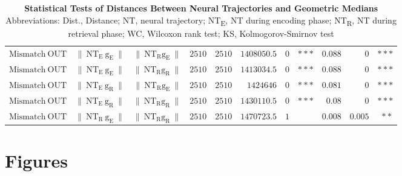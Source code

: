 \documentclass[preprint,review,12pt]{elsarticle}%
\begin{document}
\begin{table}[htbp]
\begin{tabular}{*{11}{r}}
\rowcolor{lightgray}
$\mathrm{Mismatch\ OUT}$ & $\mathrm{\mathrm{\lVert\ NT_{E}\ g_{E}\ \rVert}}$ & $\mathrm{{\mathrm{\lVert\ NT_{R}g_{E}}\ \rVert}}$ & $\mathrm{2510}$ & $\mathrm{2510}$ & $\mathrm{1408050.5}$ & $\mathrm{0}$ & $\mathrm{***}$ & $\mathrm{0.088}$ & $\mathrm{0}$ & $\mathrm{***}$\\
$\mathrm{Mismatch\ OUT}$ & $\mathrm{\mathrm{\lVert\ NT_{E}\ g_{E}\ \rVert}}$ & $\mathrm{{\mathrm{\lVert\ NT_{R}g_{R}}\ \rVert}}$ & $\mathrm{2510}$ & $\mathrm{2510}$ & $\mathrm{1413034.5}$ & $\mathrm{0}$ & $\mathrm{***}$ & $\mathrm{0.088}$ & $\mathrm{0}$ & $\mathrm{***}$\\
\rowcolor{lightgray}
$\mathrm{Mismatch\ OUT}$ & $\mathrm{\mathrm{\lVert\ NT_{E}\ g_{R}\ \rVert}}$ & $\mathrm{{\mathrm{\lVert\ NT_{R}g_{E}}\ \rVert}}$ & $\mathrm{2510}$ & $\mathrm{2510}$ & $\mathrm{1424646}$ & $\mathrm{0}$ & $\mathrm{***}$ & $\mathrm{0.081}$ & $\mathrm{0}$ & $\mathrm{***}$\\
$\mathrm{Mismatch\ OUT}$ & $\mathrm{\mathrm{\lVert\ NT_{E}\ g_{R}\ \rVert}}$ & $\mathrm{{\mathrm{\lVert\ NT_{R}g_{R}}\ \rVert}}$ & $\mathrm{2510}$ & $\mathrm{2510}$ & $\mathrm{1430110.5}$ & $\mathrm{0}$ & $\mathrm{***}$ & $\mathrm{0.08}$ & $\mathrm{0}$ & $\mathrm{***}$\\
\rowcolor{lightgray}
$\mathrm{Mismatch\ OUT}$ & $\mathrm{\mathrm{\lVert\ NT_{R}\ g_{E}\ \rVert}}$ & $\mathrm{{\mathrm{\lVert\ NT_{R}g_{R}}\ \rVert}}$ & $\mathrm{2510}$ & $\mathrm{2510}$ & $\mathrm{1470723.5}$ & $\mathrm{1}$ &  & $\mathrm{0.008}$ & $\mathrm{0.005}$ & $\mathrm{**}$\\
\bottomrule
\end{tabular}
\captionsetup{width=\textwidth}
\caption{\textbf{
Statistical Tests of Distances Between Neural Trajectories and Geometric Medians
}
\smallskip
\\
Abbreviations: Dist., Distance; NT, neural trajectory; NT\textsubscript{E}, NT during encoding phase; NT\textsubscript{R}, NT during retrieval phase; WC, Wilcoxon rank test; KS, Kolmogorov-Smirnov test
}
\label{tab:05_rank_dist}
\end{table}

\restoregeometry

\clearpage
\section*{Figures}
\label{figures}
\end{document}
